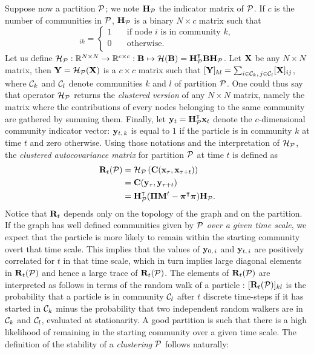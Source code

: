 Suppose now a partition $\P$; we note $\b H_{\P}$ the indicator matrix of $\P$. If $c$ is the number of communities in $\P$, $\b H_{\P}$ is a binary $N \times c$ matrix such that 
\begin{equation}
	[\b H_{\P}]_{ik} = 
	\begin{cases}
		1  & \quad \mbox{if node $i$ is in community $k$},\\
	    0  & \quad \text{otherwise}.\\
	\end{cases}
\end{equation}
Let us define $\mathcal{H}_{\P} : \R[N \times N] \rightarrow \R[c \times c] : \b B \mapsto \mathcal{H}(\b B) = \b H_{\P}^{\t} \b B \b H_{\P}$. Let $\b X$ be any $N \times N$ matrix, then $\b Y = \mathcal{H}_{\P}(\b X)$ is a $c \times c$ matrix such that $[\b Y]_{kl} = \sum_{i \in \C_k,\, j \in \C_l} [\b X]_{ij}$, where $\C_k$ and $\C_l$ denote communities $k$ and $l$ of partition $\P$. One could thus say that operator $\mathcal{H}_{\P}$ returns the \textit{clustered version} of any $N \times N$ matrix, namely the matrix where the contributions of every nodes belonging to the same community are gathered by summing them. Finally, let $\b y_t = \b H_{\P}^{\t} \b x_t$ denote the $c$-dimensional community indicator vector: $\b y_{t,\,k}$ is equal to $1$ if the particle is in community $k$ at time $t$ and zero otherwise.
Using those notations and the interpretation of $\mathcal{H}_{\P} $, the \textit{clustered autocovariance matrix} for partition $\P$ at time $t$ is defined as
\begin{align}
	\b R_t(\P) &= \mathcal{H}_{\P}\left(\b C(\b x_\tau,\b x_{\tau+t})\right)\\
		&= \b C(\b y_\tau,\b y_{\tau+t})\\
		&= \b H_{\P}^{\t}(\b \Pi\b M^t - \bs \pi^{\t}\bs \pi)\b H_{\P}.
\end{align}
Notice that $\b R_t$ depends only on the topology of the graph and on the partition. If the graph has well defined communities given by $\P$ \textit{over a given time scale}, we expect that the particle is more likely to remain within the starting community overt that time scale. This implies that the values of $\b y_{0,\,i}$ and $\b y_{t,\,i}$ are positively correlated for $t$ in that time scale, which in turn implies large diagonal elements in $\b R_t(\P)$ and hence a large trace of $\b R_t(\P)$. The elements of $\b R_t(\P)$ are interpreted as follows in terms of the random walk of a particle : $[\b R_t(\P)]_{kl}$ is the probability that a particle is in community $\C_l$ after $t$ discrete time-steps if it has started in $\C_k$ minus the probability that two independent random walkers are in $\C_k$ and $\C_l$, evaluated at stationarity. A good partition is such that there is a high likelihood of remaining in the starting community over a given time scale. The definition of the stability of a \textit{clustering} $\P$ follows naturally:
